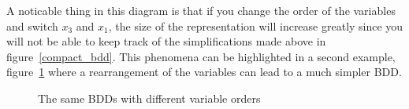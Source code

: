 \documentclass[12pt]{report}
\begin{document}
A noticable thing in this diagram is that if you change the order of the variables and switch $x_3$ and $x_1$, the size of the representation will increase greatly since you will not be able to keep track of the simplifications made above in figure~\ref{compact_bdd}. This phenomena can be highlighted in a second example, figure~\ref{reduction_bdd} where a rearrangement of the variables can lead to a much simpler BDD.

\begin{figure}[!h]
  \centering
  \caption{The same BDDs with different variable orders}
  \label{reduction_bdd}
\end{figure}
\end{document}
